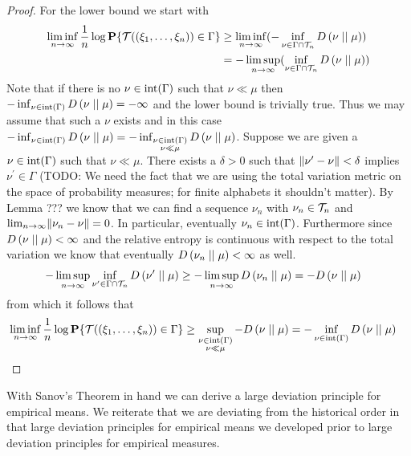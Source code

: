 \begin{proof}
For the lower bound we start with
\begin{align*}
\liminf_{n \to \infty} \frac{1}{n} \log \textbf{P}\{\mathcal{T}((\xi_1, \dotsc, \xi_n)) \in \Gamma\} 
&\geq \liminf_{n \to \infty} (-\inf_{\nu \in \Gamma \cap \mathcal{T}_{n}} D\left( \nu \mid\mid \mu \right)) \\
&= -\limsup_{n \to \infty} (\inf_{\nu \in \Gamma \cap \mathcal{T}_{n}} D\left( \nu \mid\mid \mu \right))
\end{align*}
Note that if there is no $\nu \in \operatorname*{int}(\Gamma)$ such that $\nu \ll \mu$ then $-\inf_{\nu \in \operatorname*{int}(\Gamma)} D\left( \nu \mid\mid \mu \right)= -\infty$
and the lower bound is trivially true.  Thus we may assume that such a $\nu$ exists and in this case
$-\inf_{\nu \in \operatorname*{int}(\Gamma)} D\left( \nu \mid\mid \mu \right) = -\inf_{\substack{\nu \in \operatorname*{int}(\Gamma) \\ \nu \ll \mu}} D\left( \nu \mid\mid \mu \right)$.
Suppose we are given a $\nu \in \operatorname*{int}(\Gamma)$ such that $\nu \ll \mu$.
There exists a $\delta >0$ such that $\lVert \nu^\prime - \nu \rVert < \delta$ implies $\nu^\prime \in \Gamma$ (TODO: We need the fact that
we are using the total variation metric on the space of probability measures; for finite alphabets it shouldn't matter).  By Lemma ??? we know that we
can find a sequence $\nu_n$ with $\nu_n \in \mathcal{T}_{n}$ and $\lim_{n \to \infty} \lVert \nu_n - \nu \rVert = 0$.  In particular, eventually $\nu_n \in \operatorname*{int}(\Gamma)$.  Furthermore since $D\left( \nu \mid\mid \mu \right) < \infty$ and the relative entropy is continuous with respect to the total variation we know that 
eventually $D\left( \nu_n \mid\mid \mu \right) < \infty$ as well.
\begin{align*}
- \limsup_{n \to \infty} \inf_{\nu^\prime \in \Gamma \cap \mathcal{T}_{n}} D\left( \nu^\prime \mid\mid \mu \right) 
&\geq - \limsup_{n \to \infty} D\left( \nu_n \mid\mid \mu \right) = -D\left( \nu \mid\mid \mu \right)
\end{align*}
from which it follows that
\begin{align*}
\liminf_{n \to \infty} \frac{1}{n} \log \textbf{P}\{\mathcal{T}((\xi_1, \dotsc, \xi_n)) \in \Gamma\} 
&\geq \sup_{\substack{\nu \in \operatorname*{int}(\Gamma)\\ \nu \ll \mu}} -D\left( \nu \mid\mid \mu \right) = -\inf_{\nu \in \operatorname*{int}(\Gamma)} D\left( \nu \mid\mid \mu \right)
\end{align*}
\end{proof}

With Sanov's Theorem in hand we can derive a large deviation principle for empirical means.  We reiterate that we are deviating from the historical order in
that large deviation principles for empirical means we developed prior to large deviation principles for empirical measures.

